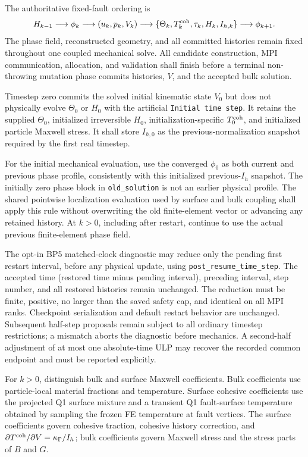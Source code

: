 \documentclass[11pt]{article}
\begin{document}
The authoritative fixed-fault ordering is
\begin{equation}
 H_{k-1}\longrightarrow\phi_k\longrightarrow(u_k,p_k,V_k)
 \longrightarrow\{\Theta_k,T_k^{\rm coh},\tau_k,H_k,I_{h,k}\}
 \longrightarrow\phi_{k+1}.
\end{equation}
The phase field, reconstructed geometry, and all committed histories remain
fixed throughout one coupled mechanical solve. All candidate construction,
MPI communication, allocation, and validation shall finish before a terminal
non-throwing mutation phase commits histories, $V$, and the accepted bulk
solution.

Timestep zero commits the solved initial kinematic state $V_0$ but does not
physically evolve $\Theta_0$ or $H_0$ with the artificial
\texttt{Initial time step}. It retains the supplied $\Theta_0$, initialized
irreversible $H_0$, initialization-specific $T_0^{\rm coh}$, and initialized
particle Maxwell stress. It shall store $I_{h,0}$ as the previous-normalization
snapshot required by the first real timestep.

For the initial mechanical evaluation, use the converged $\phi_0$ as both
current and previous phase profile, consistently with this initialized
previous-$I_h$ snapshot. The initially zero phase block in
\texttt{old\_solution} is not an earlier physical profile. The shared pointwise
localization evaluation used by surface and bulk coupling shall apply this
rule without overwriting the old finite-element vector or advancing any
retained history. At $k>0$, including after restart, continue to use the actual
previous finite-element phase field.

The opt-in BP5 matched-clock diagnostic may reduce only the pending first
restart interval, before any physical update, using
\texttt{post\_resume\_time\_step}. The accepted time (restored time minus
pending interval), preceding interval, step number, and all restored histories
remain unchanged. The reduction must be finite, positive, no larger than the
saved safety cap, and identical on all MPI ranks. Checkpoint serialization and
default restart behavior are unchanged. Subsequent half-step proposals remain
subject to all ordinary timestep restrictions; a mismatch aborts the diagnostic
before mechanics. A second-half adjustment of at most one absolute-time ULP
may recover the recorded common endpoint and must be reported explicitly.

For $k>0$, distinguish bulk and surface Maxwell coefficients. Bulk
coefficients use particle-local material fractions and temperature. Surface
cohesive coefficients use the projected Q1 surface mixture and a transient Q1
fault-surface temperature obtained by sampling the frozen FE temperature at
fault vertices. The surface coefficients govern cohesive traction, cohesive
history correction, and $\partial T^{\rm coh}/\partial V=\kappa_\Gamma/I_h$;
bulk coefficients govern Maxwell stress and the stress parts of $B$ and $G$.
\end{document}
